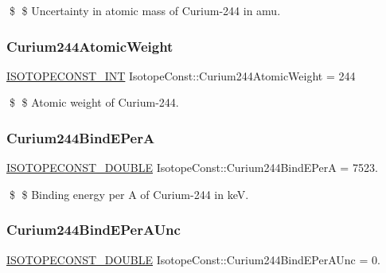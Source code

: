 \$ \$ Uncertainty in atomic mass of Curium-\/244 in amu. \mbox{\label{group___isotope_const-_curium-_cm244_ga6f392c7c86dd1a341e397559535db9f0}} 
\subsubsection{\texorpdfstring{Curium244\+Atomic\+Weight}{Curium244AtomicWeight}}
{\footnotesize\ttfamily \mbox{\hyperlink{group___isotope_const-_macros_ga5f18360b3e99483a35c32d789e62621c}{I\+S\+O\+T\+O\+P\+E\+C\+O\+N\+S\+T\+\_\+\+I\+NT}} Isotope\+Const\+::\+Curium244\+Atomic\+Weight = 244}

\$ \$ Atomic weight of Curium-\/244. \mbox{\label{group___isotope_const-_curium-_cm244_ga4a7daf0b13b9ddcf9f80825371e2635b}} 
\subsubsection{\texorpdfstring{Curium244\+Bind\+E\+PerA}{Curium244BindEPerA}}
{\footnotesize\ttfamily \mbox{\hyperlink{group___isotope_const-_macros_ga8f45a7272ce02c0b4c65c44636ed719a}{I\+S\+O\+T\+O\+P\+E\+C\+O\+N\+S\+T\+\_\+\+D\+O\+U\+B\+LE}} Isotope\+Const\+::\+Curium244\+Bind\+E\+PerA = 7523.}

\$ \$ Binding energy per A of Curium-\/244 in keV. \mbox{\label{group___isotope_const-_curium-_cm244_gac573163d1397084f1c28cc5f395ee2ce}} 
\subsubsection{\texorpdfstring{Curium244\+Bind\+E\+Per\+A\+Unc}{Curium244BindEPerAUnc}}
{\footnotesize\ttfamily \mbox{\hyperlink{group___isotope_const-_macros_ga8f45a7272ce02c0b4c65c44636ed719a}{I\+S\+O\+T\+O\+P\+E\+C\+O\+N\+S\+T\+\_\+\+D\+O\+U\+B\+LE}} Isotope\+Const\+::\+Curium244\+Bind\+E\+Per\+A\+Unc = 0.}

